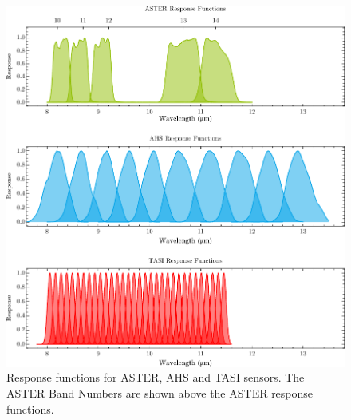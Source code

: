 \begin{figure}[!t]
\centering
\includegraphics[width=\linewidth]{pics/Chapter_04/response_functions_all.pdf}
\vspace{1.5 em}
\caption{Response functions for ASTER, AHS and TASI sensors. The ASTER Band Numbers are shown above the ASTER response functions.}
\label{fig:ResponseFunctions}
\end{figure}



